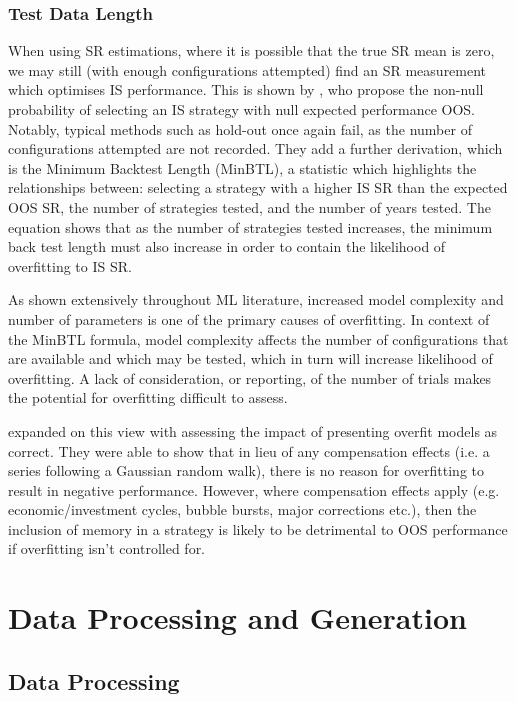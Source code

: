 \documentclass[a4paper,11pt,oneside]{article}
\theoremstyle{plain}
\theoremstyle{definition}
\begin{document}
	\subsubsection{Test Data Length}

	When using SR estimations, where it is possible that the true SR mean is 
	zero, we may still (with enough configurations attempted) find an SR measurement which optimises IS performance. 
	This is shown by \citet{BaileyBTL}, who propose the non-null probability of selecting an IS strategy with null expected 
	performance OOS. Notably, typical methods such as hold-out once again fail, as the number of configurations 
	attempted are not recorded. They add a further derivation, which is the Minimum Backtest Length (MinBTL), a statistic which highlights the relationships between: selecting a strategy with a higher IS SR than the expected OOS SR, 
	the number of strategies tested, and the number of years tested. The equation shows that  as the number 
	of strategies tested increases, the minimum back test length must also increase in order to contain the likelihood 
	of overfitting to IS SR. 
	\hfill \break 
	
	As shown extensively throughout ML literature, increased model complexity and number of parameters is one of 
	the primary causes of overfitting. In context of the MinBTL formula, model complexity affects the number of 
	configurations that are available and which may be tested, which in turn will increase likelihood of overfitting. 
	A lack of consideration, or reporting, of the number of trials makes the potential for overfitting difficult to assess. 
	\hfill \break 
	
	\citet{BaileyBTL} expanded on this view with assessing the impact of presenting overfit models as correct. 
	They were able to show that in lieu of any compensation effects (i.e. a series following a Gaussian random walk), 
	there is no reason for overfitting to result in negative performance. However, where compensation effects apply 
	(e.g. economic/investment cycles, bubble bursts, major corrections etc.), then the inclusion of memory in a strategy
	is likely to be detrimental to OOS performance if overfitting isn’t controlled for.
	\hfill \break 
	
	\newpage
	
	\section{Data Processing and Generation }\label{Data}
	\subsection{Data Processing}\label{data_processing}
	
\end{document}
